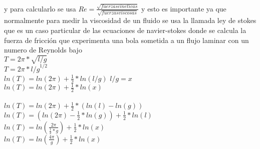 \documentclass{article}
\begin{document}
y para calcularlo se usa $Re=\frac{\sqrt{fuerzas cineticas}}{\sqrt{fuerzas viscosas}}$
y esto es importante ya que normalmente para medir la viscosidad de un fluido se usa 
la llamada ley de stokes que es un caso particular de las ecuaciones de navier-stokes
donde se calcula la fuerza de fricción que experimenta una bola sometida a un flujo laminar con un numero de Reynolds
bajo\\
$T=2\pi*\sqrt{l/g}$\\
$T=2\pi*{l/g}^{1/2}$\\
$ln(T)=ln(2\pi)+\frac{1}{2}*ln(l/g)$
$l/g=x$\\
$ln(T)=ln(2\pi)+\frac{1}{2}*ln(x)$\\
\\
$ln(T)=ln(2\pi)+\frac{1}{2}*(ln(l)-ln(g))$\\
$ln(T)=(ln(2\pi)-\frac{1}{2}*ln(g))+\frac{1}{2}*ln(l)$\\
$ln(T)=ln(\frac{2\pi}{\frac{1}{2}*g})+\frac{1}{2}*ln(x)$\\
$ln(T)=ln(\frac{4\pi}{g})+\frac{1}{2}*ln(x)$
\end{document}

